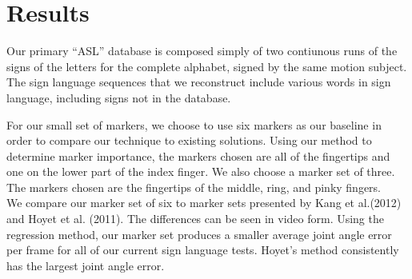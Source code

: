 

\section{Results}
Our primary ``ASL'' database is composed simply of two contiunous
runs of the signs of the letters for the complete 
alphabet,
signed by the same motion subject. 
The sign language sequences that we  
reconstruct include various words in sign language, including
signs not in the database.

For our small set of markers, we choose to use six markers as our
baseline in order to compare our technique to existing solutions. 
Using our method to determine 
marker importance, the markers chosen are all of the fingertips
and one on the lower part of the index finger. We also choose a
marker set of three. The markers chosen are the fingertips of the 
middle, ring, and pinky fingers.\\
%
We compare our marker set of six to marker sets presented by
Kang et al.(2012) and Hoyet et al. (2011). The differences can
be seen in video form. Using the regression method, our marker 
set produces a smaller average joint angle error per frame 
for all of our current sign language tests. Hoyet's method 
consistently has the largest joint angle error.\\